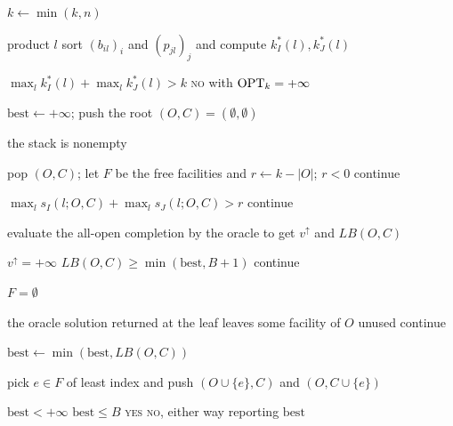 \begin{algorithm}[H]
\caption{Branch-and-bound for $\mathrm{MP\text{-}TSCFLP}(B,k)$
(Theorem~\ref{thm:xp}).}
\label{alg:xpbb}
\begin{pseudolines}
\item $k\gets\min(k,n)$ 
\item {} product $l$ sort $(b_{il})_i$ and $(p_{jl})_j$ and
  compute $k^\ast_I(l),k^\ast_J(l)$ 
\item {}
  $\max_l k^\ast_I(l)+\max_l k^\ast_J(l)>k$  
  \textsc{no} with $\mathrm{OPT}_k=+\infty$
\item $\mathrm{best}\gets+\infty$; push the root $(O,C)=(\emptyset,\emptyset)$
\item {} the stack is nonempty 
\item \algin pop $(O,C)$; let $F$ be the free facilities and
  $r\gets k-|O|$;  $r<0$  continue
\item \algin {}
  $\max_l s_I(l;O,C)+\max_l s_J(l;O,C)>r$  continue
\item \algin evaluate the all-open completion by the oracle to get
  $v^{\uparrow}$ and $LB(O,C)$
\item \algin {} $v^{\uparrow}=+\infty$ 
  $LB(O,C)\ge\min(\mathrm{best},B+1)$  continue
\item \algin {} $F=\emptyset$ 
\item \algin\algin {} the oracle solution returned at the leaf
  leaves some facility of $O$ unused  continue
\item \algin\algin $\mathrm{best}\gets\min(\mathrm{best},LB(O,C))$
\item \algin {} pick $e\in F$ of least index and push
  $(O\cup\{e\},C)$ and $(O,C\cup\{e\})$
\item {} $\mathrm{best}<+\infty$  $\mathrm{best}\le B$
    \textsc{yes}   \textsc{no},
  either way reporting $\mathrm{best}$
\end{pseudolines}
\end{algorithm}

